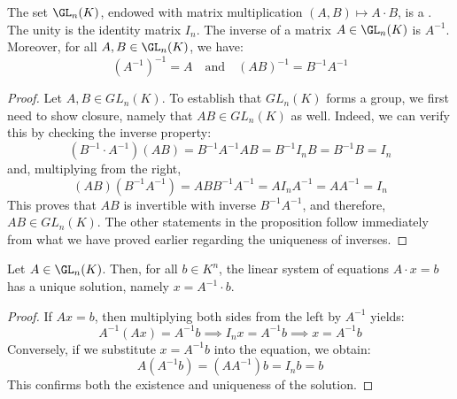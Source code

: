 \begin{proposition}
\label{prop:gl_group_structure}
The set $\GL_n(K)$, endowed with matrix multiplication $(A, B) \mapsto A \cdot B$, is a . The unity is the identity matrix $I_n$. The inverse of a matrix $A \in \GL_n(K)$ is $A^{-1}$. Moreover, for all $A, B \in \GL_n(K)$, we have:
\begin{equation*}
    (A^{-1})^{-1} = A \quad \text{and} \quad (AB)^{-1} = B^{-1}A^{-1}
\end{equation*}
\end{proposition}

\begin{proof}
Let $A, B \in GL_n(K)$. To establish that $GL_n(K)$ forms a group, we first need to show closure, namely that $AB \in GL_n(K)$ as well. Indeed, we can verify this by checking the inverse property:
\begin{equation*}
    (B^{-1} \cdot A^{-1})(AB) = B^{-1}A^{-1}AB = B^{-1}I_nB = B^{-1}B = I_n
\end{equation*}
and, multiplying from the right,
\begin{equation*}
    (AB)(B^{-1}A^{-1}) = ABB^{-1}A^{-1} = AI_nA^{-1} = AA^{-1} = I_n
\end{equation*}
This proves that $AB$ is invertible with inverse $B^{-1}A^{-1}$, and therefore, $AB \in GL_n(K)$. The other statements in the proposition follow immediately from what we have proved earlier regarding the uniqueness of inverses.
\end{proof}

\begin{corollary}
\label{cor:unique_solution_via_inverse}
Let $A \in \GL_n(K)$. Then, for all $b \in K^n$, the linear system of equations $A \cdot x = b$ has a unique solution, namely $x = A^{-1} \cdot b$.
\end{corollary}

\begin{proof}
If $Ax = b$, then multiplying both sides from the left by $A^{-1}$ yields:
\begin{equation*}
    A^{-1}(Ax) = A^{-1}b \implies I_n x = A^{-1}b \implies x = A^{-1}b
\end{equation*}
Conversely, if we substitute $x = A^{-1}b$ into the equation, we obtain:
\begin{equation*}
    A(A^{-1}b) = (AA^{-1})b = I_n b = b
\end{equation*}
This confirms both the existence and uniqueness of the solution.
\end{proof}

